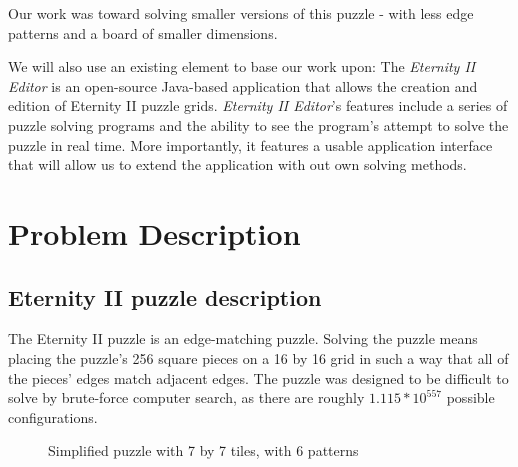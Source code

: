 \documentclass{llncs}
\begin{document}

Our work was toward solving smaller versions of this puzzle - with less edge patterns and a board of smaller dimensions.

We will also use an existing element to base our work upon: The \textit{Eternity II Editor} is an open-source Java-based application that allows the creation and edition of Eternity II puzzle grids. \textit{Eternity II Editor}'s features include a series of puzzle solving programs and the ability to see the program's attempt to solve the puzzle in real time. More importantly, it features a usable application interface that will allow us to extend the application with out own solving methods.

\section{Problem Description}\label{sec:problem_description}

\subsection{Eternity II puzzle description}\label{sec:puzzle_description}

The Eternity II puzzle is an edge-matching puzzle. Solving the puzzle means placing the puzzle's 256 square pieces on a 16 by 16  grid in such a way that all of the pieces' edges match adjacent edges. The puzzle was designed to be difficult to solve by brute-force computer search, as there are roughly $1.115 * 10 ^ {557}$ possible configurations.

\begin{figure}[H]
  \centering
  \hspace{5mm}
  \caption{Simplified puzzle with 7 by 7 tiles, with 6 patterns}
  \label{fig:7x7_example}
\end{figure}
\end{document}

